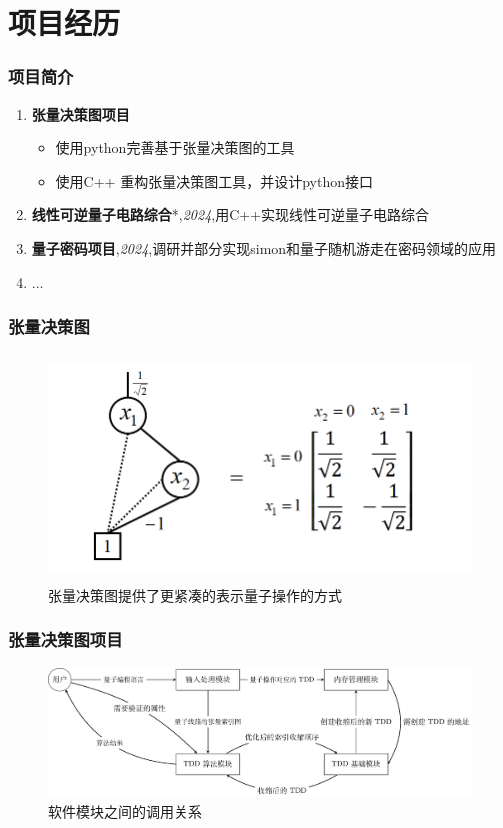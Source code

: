 \documentclass[aspectratio=1610]{beamer}
\begin{document}
\section{项目经历}
\begin{frame}
\frametitle{项目简介}
\begin{enumerate}
    \setlength{\itemsep}{10pt}
    \item \textbf{张量决策图项目} 
    \begin{itemize}
        \item 使用python完善基于张量决策图的工具
        \item 使用C++ 重构张量决策图工具，并设计python接口
    \end{itemize}
    \item \textbf{线性可逆量子电路综合}*,\textit{2024},用C++实现线性可逆量子电路综合
    \item \textbf{量子密码项目},\textit{2024},调研并部分实现simon和量子随机游走在密码领域的应用
    \item \(\dots\)
\end{enumerate}
\end{frame}

\begin{frame}
\frametitle{张量决策图}
\begin{figure}
    \centering
    \includegraphics[height=6cm]{TDD_H_gate2.png}
    \caption{张量决策图提供了更紧凑的表示量子操作的方式}
\end{figure}
\end{frame}
\begin{frame}
\frametitle{张量决策图项目}
\begin{figure}[htbp]
    \includegraphics[width=\textwidth]{alg_flow.pdf}
    \caption{软件模块之间的调用关系}
    \label{fig-flow}
\end{figure}
\end{frame}
\end{document}
